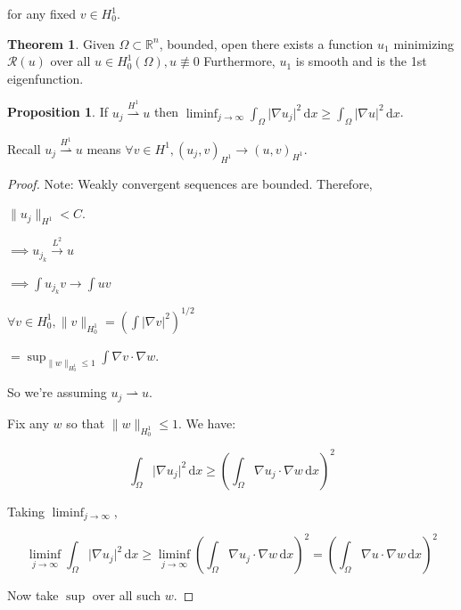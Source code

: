 \documentclass{article}
\theoremstyle{definition}
\newtheorem{theorem}{Theorem}
\newtheorem{proposition}{Proposition}
\begin{document}
for any fixed \(v \in H^1_0\).

\begin{theorem}
    Given \(\Omega \subset \mathbb{R}^n\), bounded, open there exists a function \(u_1\) minimizing \(\mathcal{R} (u)\) over all \(u\in H^1_0(\Omega), u\not\equiv 0\) Furthermore, \(u_1\) is smooth and is the 1st eigenfunction.
\end{theorem}

\begin{proposition}
    If \(u_j \overset{H^1}{\rightharpoonup} u\) then \(\liminf_{j \to \infty} \int_{\Omega} \vert \nabla u_j \vert ^{2} \,\mathrm{d}x \geq \int_{\Omega} \vert \nabla u \vert ^2 \,\mathrm{d}x \).
\end{proposition}

Recall \(u_j \overset{H^1}{\rightharpoonup} u\) means \(\forall v\in H^1, (u_j, v)_{H^1} \to (u,v)_{H^1}\).

\begin{proof}
    Note: Weakly convergent sequences are bounded. Therefore,

    \(\lVert u_j \rVert _{H^1} < C\).

    \(\implies u_{j_k} \overset{L^2}{\to} u\) 

    \(\implies \int u_{j_k} v \to \int uv\) 

    \(\forall v\in H^1_0, \lVert v \rVert _{H^1_0} = \left( \int \vert \nabla v \vert ^{2} \right) ^{1 / 2}\)
    
    \(= \sup_{\lVert w \rVert _{H^1_0} \leq 1} \int \nabla v \cdot \nabla w\).
    
    So we're assuming \(u_j \rightharpoonup u\).


    Fix any \(w\) so that \(\lVert w \rVert _{H^1_0} \leq 1\). We have:
    
    \[
        \int_{\Omega} \vert \nabla u_j \vert ^{2} \,\mathrm{d}x \geq \left( \int_{\Omega} \nabla u_j \cdot \nabla w \,\mathrm{d}x  \right) ^ 2
    \]

    Taking \(\liminf_{j \to \infty}\),

    \[
        \liminf_{j \to \infty} \int_{\Omega} \vert \nabla u_j \vert ^{2} \,\mathrm{d}x \geq \liminf_{j \to \infty} \left( \int_{\Omega} \nabla u_j \cdot \nabla w \,\mathrm{d}x  \right) ^{2} = \left( \int_{\Omega} \nabla u \cdot \nabla w \,\mathrm{d}x  \right) ^{2} 
    \]

    Now take \(\sup\) over all such \(w\).

\end{proof}
\end{document}
